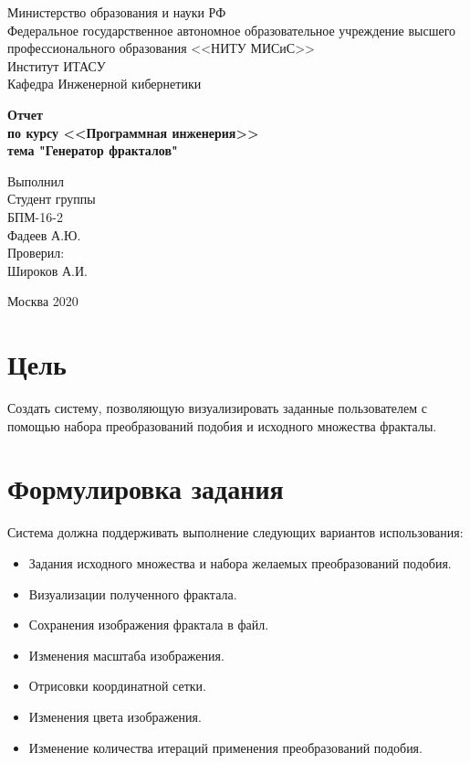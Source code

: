 \documentclass[a4paper,12pt,preview]{report} %
\begin{document}
	
	\begin{center}
		Министерство образования и науки РФ \\
		Федеральное государственное автономное образовательное учреждение высшего профессионального образования <<НИТУ МИСиС>>\\
		Институт ИТАСУ\\
		Кафедра Инженерной кибернетики\\
	\end{center}
	
	
	\vfill
	
	\begin{center}
		\Large\textbf{Отчет  \\
			по курсу <<Программная инженерия>>\\
		тема "Генератор фракталов"}
	\end{center}
	
	\vfill
	
	\begin{FlushRight}
		Выполнил\\
		Студент группы \\
		БПМ-16-2 \\
		Фадеев А.Ю. \\
		[\baselineskip]
		Проверил: \\
		Широков А.И. \\
		[9\baselineskip]
	\end{FlushRight}
	
	
	\begin{center}
		Москва 2020
	\end{center}
	
	\thispagestyle{empty}
	\newpage
	
	\tableofcontents
	\newpage
	
	
	\section{Цель}
	
	Создать систему, позволяющую визуализировать заданные пользователем с помощью набора преобразований подобия и исходного множества фракталы.
	
	
	\section{Формулировка задания}
	
	Система должна поддерживать выполнение следующих вариантов использования:
	
	\begin{itemize}
		\item Задания исходного множества и набора желаемых преобразований подобия.
		\item Визуализации полученного фрактала.
		\item Сохранения изображения фрактала в файл.
		\item Изменения масштаба изображения.
		\item Отрисовки координатной сетки.
		\item Изменения цвета изображения.
		\item Изменение количества итераций применения преобразований подобия.
	\end{itemize}
	
\end{document}
